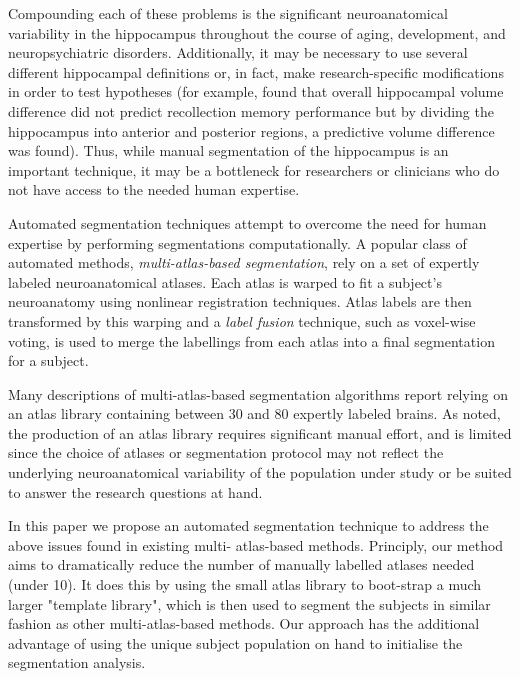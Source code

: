 \documentclass{article}\usepackage{graphicx, color}
\begin{document}
Compounding each of these problems is the significant neuroanatomical
variability in the hippocampus throughout the course of aging, development, and
neuropsychiatric disorders\cite{Mouiha2011}.  Additionally, it may be necessary
to use several different hippocampal definitions or, in fact, make
research-specific modifications in order to test hypotheses (for example,
\cite{Poppenk2011} found that overall hippocampal volume difference did not
predict recollection memory performance but by dividing the hippocampus into
anterior and posterior regions, a predictive volume difference was found).
Thus, while manual segmentation of the hippocampus is an important technique,
it may be a bottleneck for researchers or clinicians who do not have access to
the needed human expertise.

Automated segmentation techniques attempt to overcome the need for human
expertise by performing segmentations computationally.  A popular class of
automated methods, {\it multi-atlas-based segmentation}, rely on a set of
expertly labeled neuroanatomical atlases. Each atlas is warped to fit a
subject's neuroanatomy using nonlinear registration
techniques\cite{Collins1995,Klein2009}.  Atlas labels are then transformed
by this warping and a {\it label fusion} technique, such as voxel-wise
voting, is used to merge the labellings from each atlas into a final
segmentation for a subject.  

Many descriptions of multi-atlas-based segmentation algorithms report relying on an
atlas library containing between 30 and 80 expertly labeled
brains\cite{Heckemann2011,Collins2010,Aljabar2009,Leung2010,Lotjonen2010}.
As noted, the production of an atlas library requires significant manual
effort, and is limited since the choice of atlases or segmentation protocol may
not reflect the underlying neuroanatomical variability of the population under
study or be suited to answer the research questions at hand.

In this paper we propose an automated segmentation technique to address the
above issues found in existing multi- atlas-based methods. Principly, our
method aims to dramatically reduce the number of manually labelled atlases
needed (under 10). It does this by using the small atlas library to boot-strap
a much larger "template library", which is then used to segment the subjects in
similar fashion as other multi-atlas-based methods. Our approach has the
additional advantage of using the unique subject population on hand to
initialise the segmentation analysis.
\end{document}
